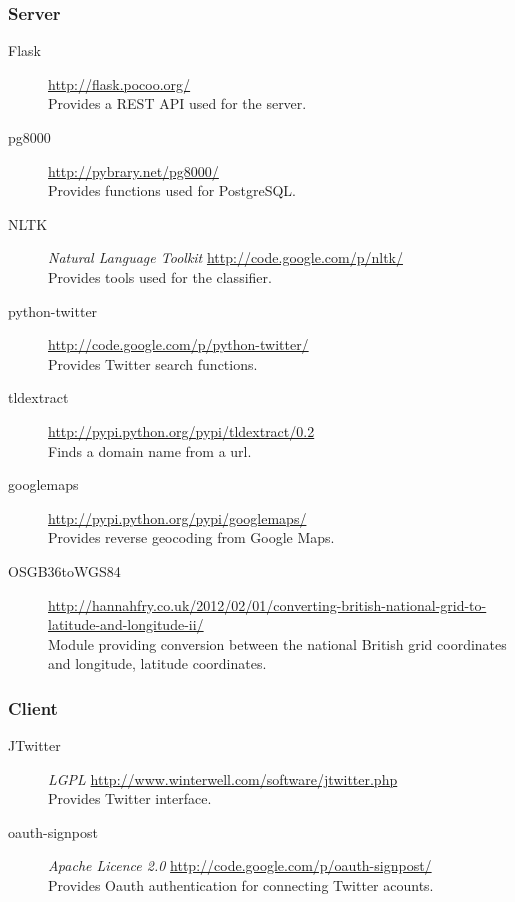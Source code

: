 \subsubsection{Server}

\begin{description}
    \item[Flask] \url{http://flask.pocoo.org/} \hfill \\
        Provides a REST API used for the server.
    \item[pg8000] \url{http://pybrary.net/pg8000/} \hfill \\
        Provides functions used for PostgreSQL.
    \item[NLTK] \emph{Natural Language Toolkit} \url{http://code.google.com/p/nltk/} \hfill \\
        Provides tools used for the classifier.
    \item[python-twitter] \url{http://code.google.com/p/python-twitter/} \hfill \\
        Provides Twitter search functions.
    \item[tldextract] \url{http://pypi.python.org/pypi/tldextract/0.2} \hfill \\
        Finds a domain name from a url.
    \item[googlemaps] \url{http://pypi.python.org/pypi/googlemaps/} \hfill \\
        Provides reverse geocoding from Google Maps.
    \item[OSGB36toWGS84] \url{http://hannahfry.co.uk/2012/02/01/converting-british-national-grid-to-latitude-and-longitude-ii/} \hfill \\
        Module providing conversion between the national British grid coordinates and longitude, latitude coordinates.
\end{description}

\subsubsection{Client}

\begin{description}
    \item[JTwitter] \emph{LGPL} \url{http://www.winterwell.com/software/jtwitter.php} \hfill \\
        Provides Twitter interface.
    \item[oauth-signpost] \emph{Apache Licence 2.0} \url{http://code.google.com/p/oauth-signpost/} \hfill \\
        Provides Oauth authentication for connecting Twitter acounts.
\end{description}
